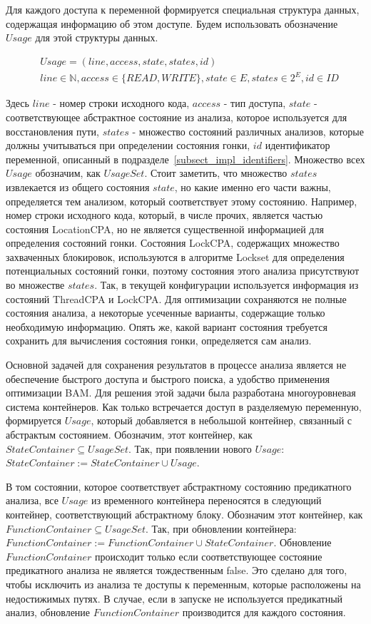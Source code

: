 Для каждого доступа к переменной формируется специальная структура данных, содержащая информацию об этом доступе. 
Будем использовать обозначение $Usage$ для этой структуры данных.

\begin{align}
& Usage = (line, access, state, states, id) \nonumber \\ 
& line \in \mathbb{N}, access \in \{READ, WRITE\}, state \in E, states \in 2^E, id \in ID \nonumber
\end{align}

Здесь $line$ - номер строки исходного кода, $access$ - тип доступа, $state$ - соответствующее абстрактное состояние из анализа, которое используется для восстановления пути, $states$ - множество состояний различных анализов, которые должны учитываться при определении состояния гонки, $id$ идентификатор переменной, описанный в подразделе~\ref{subsect_impl_identifiers}.
Множество всех $Usage$ обозначим, как $UsageSet$. 
Стоит заметить, что множество $states$ извлекается из общего состояния $state$, но какие именно его части важны, определяется тем анализом, который соответствует этому состоянию.
Например, номер строки исходного кода, который, в числе прочих, является частью состояния LocationCPA, но не является существенной информацией для определения состояний гонки. 
Состояния LockCPA, содержащих множество захваченных блокировок, используются в алгоритме Lockset для определения потенциальных состояний гонки, поэтому состояния этого анализа присутствуют во множестве $states$. 
Так, в текущей конфигурации используется информация из состояний ThreadCPA и LockCPA. 
Для оптимизации сохраняются не полные состояния анализа, а некоторые усеченные варианты, содержащие только необходимую информацию.
Опять же, какой вариант состояния требуется сохранить для вычисления состояния гонки, определяется сам анализ.

Основной задачей для сохранения результатов в процессе анализа является не обеспечение быстрого доступа и быстрого поиска, а удобство применения оптимизации BAM. 
Для решения этой задачи была разработана многоуровневая система контейнеров. 
Как только встречается доступ в разделяемую переменную, формируется $Usage$, который добавляется в небольшой контейнер, связанный с абстрактым состоянием. Обозначим, этот контейнер, как $StateContainer \subseteq UsageSet$.
Так, при появлении нового $Usage$: $StateContainer := StateContainer \cup Usage$.

В том состоянии, которое соответствует абстрактному состоянию предикатного анализа, все $Usage$ из временного контейнера переносятся в следующий контейнер, соответствующий абстрактному блоку. Обозначим этот контейнер, как $FunctionContainer \subseteq UsageSet$.
Так, при обновлении контейнера: $FunctionContainer := FunctionContainer \cup StateContainer$.
Обновление $FunctionContainer$ происходит только если соответствующее состояние предикатного анализа не является тождественным false.
Это сделано для того, чтобы исключить из анализа те доступы к переменным, которые расположены на недостижимых путях.
В случае, если в запуске не используется предикатный анализ, обновление $FunctionContainer$ производится для каждого состояния.

